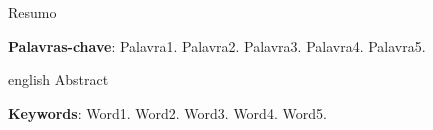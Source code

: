 \setlength{\absparsep}{18pt} %

\begin{resumo}
Resumo

\noindent\textbf{Palavras-chave}: Palavra1. Palavra2. Palavra3. Palavra4. Palavra5.
\end{resumo}

\begin{resumo}[Abstract]
\begin{otherlanguage*}{english}
Abstract
   
\noindent \textbf{Keywords}: Word1. Word2. Word3. Word4. Word5.
\end{otherlanguage*}
\end{resumo}



